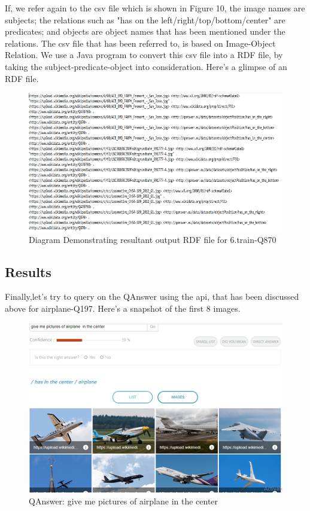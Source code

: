 \documentclass[12pt]{article}
\begin{document}
If, we refer again to the csv file which is shown in Figure 10, the image names are subjects; the relations such as "has on the left/right/top/bottom/center" are predicates; and objects are object names that has been mentioned under the relations. The csv file that has been referred to, is based on Image-Object Relation. We use a Java program to convert this csv file into a RDF file, by taking the subject-predicate-object into consideration. Here's a glimpse of an RDF file.
\begin{figure}[!h]
\center
\includegraphics{ntFole.png}

\caption{Diagram Demonstrating resultant output RDF file for 6.train-Q870}
\end{figure}


\subsection{Results}
Finally,let's try to query on the QAnswer using the api, that has been discussed above for airplane-Q197. Here's a snapshot of the first 8 images. 
\begin{figure}[!h]
\center
\includegraphics{airplaneQAnswer.PNG}
\caption{QAnswer: give me pictures of airplane  in the center}
\end{figure}
\end{document}
